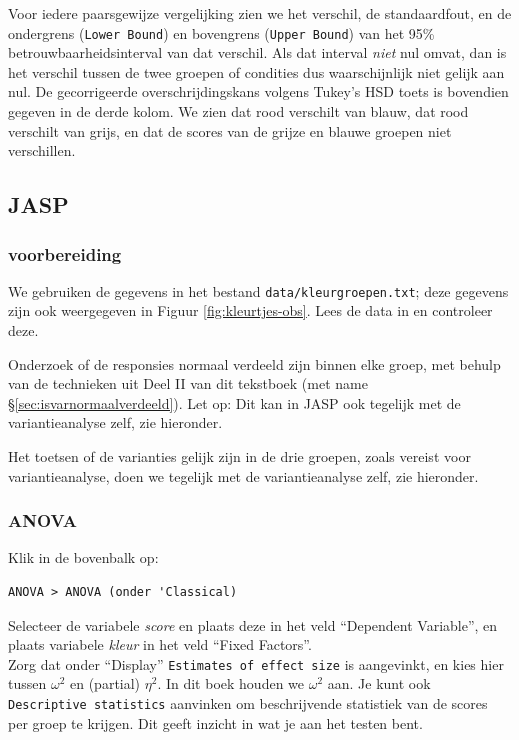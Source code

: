 \documentclass[
]{book}
\begin{document}
Voor iedere paarsgewijze vergelijking zien we het verschil, de
standaardfout, en de ondergrens (\texttt{Lower\ Bound}) en bovengrens
(\texttt{Upper\ Bound}) van het 95\% betrouwbaarheidsinterval van dat verschil.
Als dat interval \emph{niet} nul omvat, dan is het verschil tussen de twee
groepen of condities dus waarschijnlijk niet gelijk aan nul. De
gecorrigeerde overschrijdingskans volgens Tukey's HSD toets is bovendien
gegeven in de derde kolom. We zien dat rood verschilt van blauw, dat
rood verschilt van grijs, en dat de scores van de grijze en blauwe
groepen niet verschillen.

\subsection{JASP}\label{jasp-14}

\subsubsection{voorbereiding}\label{voorbereiding-2}

We gebruiken de gegevens in het bestand \texttt{data/kleurgroepen.txt}; deze gegevens zijn ook weergegeven in Figuur \ref{fig:kleurtjes-obs}.
Lees de data in en controleer deze.

Onderzoek of de responsies normaal verdeeld zijn binnen elke groep, met behulp van de
technieken uit Deel II van dit tekstboek (met name
§\ref{sec:isvarnormaalverdeeld}). Let op: Dit kan in JASP ook tegelijk met de variantieanalyse zelf, zie hieronder.

Het toetsen of de varianties gelijk zijn in de
drie groepen, zoals vereist voor variantieanalyse, doen we tegelijk
met de variantieanalyse zelf, zie hieronder.

\subsubsection{ANOVA}\label{anova-1}

Klik in de bovenbalk op:

\begin{verbatim}
ANOVA > ANOVA (onder 'Classical)
\end{verbatim}

Selecteer de variabele \emph{score} en plaats deze in het veld ``Dependent Variable'', en plaats variabele \emph{kleur} in het veld ``Fixed Factors''.\\
Zorg dat onder ``Display'' \texttt{Estimates\ of\ effect\ size} is aangevinkt, en kies hier tussen \(\omega^2\) en (partial) \(\eta^2\). In dit boek houden we \(\omega^2\) aan. Je kunt ook \texttt{Descriptive\ statistics} aanvinken om beschrijvende statistiek van de scores per groep te krijgen. Dit geeft inzicht in wat je aan het testen bent.
\end{document}
